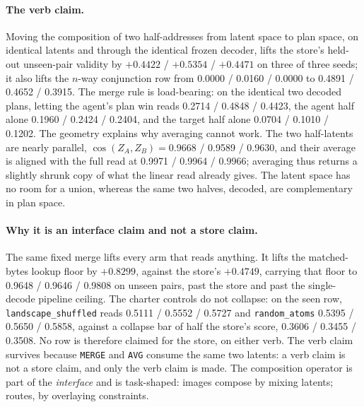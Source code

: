 \documentclass{article} %
\begin{document}
\paragraph{The verb claim.} Moving the composition of two half-addresses from latent space to
plan space, on identical latents and through the identical frozen decoder, lifts the store's
held-out unseen-pair validity by $+0.4422$ / $+0.5354$ / $+0.4471$ on three of three seeds; it
also lifts the $n$-way conjunction row from 0.0000 / 0.0160 / 0.0000 to 0.4891 / 0.4652 / 0.3915.
The merge rule is load-bearing: on the identical two decoded plans, letting the agent's plan
win reads 0.2714 / 0.4848 / 0.4423, the agent half alone 0.1960 / 0.2424 / 0.2404, and the target
half alone 0.0704 / 0.1010 / 0.1202. %
The geometry explains why averaging cannot work. The two half-latents are nearly parallel,
$\cos(Z_A,Z_B)=0.9668$ / 0.9589 / 0.9630, and their average is aligned with the full read at
0.9971 / 0.9964 / 0.9966; averaging thus returns a slightly shrunk copy of what the linear read
already gives. The latent space has no room for a union, whereas the same two halves, decoded,
are complementary in plan space. %

\paragraph{Why it is an interface claim and not a store claim.} The same fixed merge lifts every
arm that reads anything. It lifts the matched-bytes lookup floor by $+0.8299$, against the
store's $+0.4749$, carrying that floor to 0.9648 / 0.9646 / 0.9808 on unseen pairs, past the
store and past the single-decode pipeline ceiling. %
The charter controls do not collapse: on the seen row, \texttt{landscape\_shuffled} reads 0.5111
/ 0.5552 / 0.5727 and \texttt{random\_atoms} 0.5395 / 0.5650 / 0.5858, against a collapse bar of
half the store's score, 0.3606 / 0.3455 / 0.3508. %
No row is therefore claimed for the store, on either verb. The verb claim survives because
\texttt{MERGE} and \texttt{AVG} consume the same two latents: a verb claim is not a store claim,
and only the verb claim is made. The composition operator is part of the \emph{interface} and is task-shaped: images compose by mixing latents; routes, by overlaying constraints.
\end{document}
